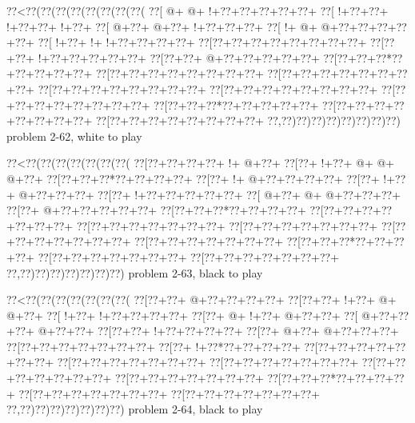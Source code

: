 \vbox{\vbox{\goo
\0??<\0??(\0??(\0??(\0??(\0??(\0??(\0??(\0??(
\0??[\- @+\- @+\- !+\0??+\0??+\0??+\0??+\0??+
\0??[\- !+\0??+\0??+\- !+\0??+\0??+\- !+\0??+
\0??[\- @+\0??+\- @+\0??+\- !+\0??+\0??+\0??+
\0??[\- !+\- @+\- @+\0??+\0??+\0??+\0??+\0??+
\0??[\- !+\0??+\- !+\- !+\0??+\0??+\0??+\0??+
\0??[\0??+\0??+\0??+\0??+\0??+\0??+\0??+\0??+
\0??[\0??+\0??+\- !+\0??+\0??+\0??+\0??+\0??+
\0??[\0??+\0??+\- @+\0??+\0??+\0??+\0??+\0??+
\0??[\0??+\0??+\0??*\0??+\0??+\0??+\0??+\0??+
\0??[\0??+\0??+\0??+\0??+\0??+\0??+\0??+\0??+
\0??[\0??+\0??+\0??+\0??+\0??+\0??+\0??+\0??+
\0??[\0??+\0??+\0??+\0??+\0??+\0??+\0??+\0??+
\0??[\0??+\0??+\0??+\0??+\0??+\0??+\0??+\0??+
\0??[\0??+\0??+\0??+\0??+\0??+\0??+\0??+\0??+
\0??[\0??+\0??+\0??*\0??+\0??+\0??+\0??+\0??+
\0??[\0??+\0??+\0??+\0??+\0??+\0??+\0??+\0??+
\0??[\0??+\0??+\0??+\0??+\0??+\0??+\0??+\0??+
\0??,\0??)\0??)\0??)\0??)\0??)\0??)\0??)\0??)
}
\hfil problem 2-62, white to play\hfil\break
}

\vbox{\vbox{\goo
\0??<\0??(\0??(\0??(\0??(\0??(\0??(\0??(
\0??[\0??+\0??+\0??+\0??+\- !+\- @+\0??+
\0??[\0??+\- !+\0??+\- @+\- @+\- @+\0??+
\0??[\0??+\0??+\0??*\0??+\0??+\0??+\0??+
\0??[\0??+\- !+\- @+\0??+\0??+\0??+\0??+
\0??[\0??+\- !+\0??+\- @+\0??+\0??+\0??+
\0??[\0??+\- !+\0??+\0??+\0??+\0??+\0??+
\0??[\- @+\0??+\- @+\- @+\0??+\0??+\0??+
\0??[\0??+\- @+\0??+\0??+\0??+\0??+\0??+
\0??[\0??+\0??+\0??*\0??+\0??+\0??+\0??+
\0??[\0??+\0??+\0??+\0??+\0??+\0??+\0??+
\0??[\0??+\0??+\0??+\0??+\0??+\0??+\0??+
\0??[\0??+\0??+\0??+\0??+\0??+\0??+\0??+
\0??[\0??+\0??+\0??+\0??+\0??+\0??+\0??+
\0??[\0??+\0??+\0??+\0??+\0??+\0??+\0??+
\0??[\0??+\0??+\0??*\0??+\0??+\0??+\0??+
\0??[\0??+\0??+\0??+\0??+\0??+\0??+\0??+
\0??[\0??+\0??+\0??+\0??+\0??+\0??+\0??+
\0??,\0??)\0??)\0??)\0??)\0??)\0??)\0??)
}
\hfil problem 2-63, black to play\hfil\break
}

\vbox{\vbox{\goo
\0??<\0??(\0??(\0??(\0??(\0??(\0??(\0??(
\0??[\0??+\0??+\- @+\0??+\0??+\0??+\0??+
\0??[\0??+\0??+\- !+\0??+\- @+\- @+\0??+
\0??[\- !+\0??+\- !+\0??+\0??+\0??+\0??+
\0??[\0??+\- @+\- !+\0??+\- @+\0??+\0??+
\0??[\- @+\0??+\0??+\0??+\- @+\0??+\0??+
\0??[\0??+\0??+\- !+\0??+\0??+\0??+\0??+
\0??[\0??+\- @+\0??+\- @+\0??+\0??+\0??+
\0??[\0??+\0??+\0??+\0??+\0??+\0??+\0??+
\0??[\0??+\- !+\0??*\0??+\0??+\0??+\0??+
\0??[\0??+\0??+\0??+\0??+\0??+\0??+\0??+
\0??[\0??+\0??+\0??+\0??+\0??+\0??+\0??+
\0??[\0??+\0??+\0??+\0??+\0??+\0??+\0??+
\0??[\0??+\0??+\0??+\0??+\0??+\0??+\0??+
\0??[\0??+\0??+\0??+\0??+\0??+\0??+\0??+
\0??[\0??+\0??+\0??*\0??+\0??+\0??+\0??+
\0??[\0??+\0??+\0??+\0??+\0??+\0??+\0??+
\0??[\0??+\0??+\0??+\0??+\0??+\0??+\0??+
\0??,\0??)\0??)\0??)\0??)\0??)\0??)\0??)
}
\hfil problem 2-64, black to play\hfil\break
}

